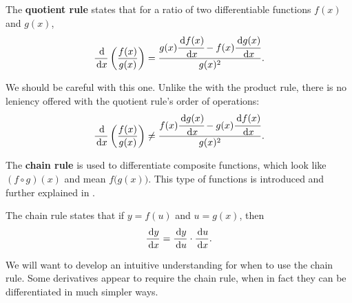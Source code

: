 \begin{theorem}
  The \textbf{quotient rule} states that for a ratio of two differentiable functions $f(x)$ and $g(x)$,
  \begin{equation}
    \frac{\,\mathrm{d}}{\,\mathrm{d} x}\left(\frac{f(x)}{g(x)}\right)=\frac{g(x)\cfrac{\,\mathrm{d} f(x)}{\,\mathrm{d} x}-f(x)\cfrac{\,\mathrm{d} g(x)}{\,\mathrm{d} x}}{g(x)^2}.
  \end{equation}
\end{theorem}
We should be careful with this one.
Unlike the with the product rule, there is no leniency offered with the quotient rule's order of operations:
\begin{equation}
  \frac{\,\mathrm{d}}{\,\mathrm{d} x}\left(\frac{f(x)}{g(x)}\right) \neq \frac{f(x)\cfrac{\,\mathrm{d} g(x)}{\,\mathrm{d} x}-g(x)\cfrac{\,\mathrm{d} f(x)}{\,\mathrm{d} x}}{g(x)^2}.
\end{equation}


The \textbf{chain rule} is used to differentiate composite functions, which look like $(f \circ g)(x)$ and mean $f\big(g(x)\big)$.
This type of functions is introduced and further explained in .
\begin{theorem}
  The chain rule states that if $y=f(u)$ and $u=g(x)$, then
  \begin{equation}
    \frac{\,\mathrm{d} y}{\,\mathrm{d} x}=\frac{\,\mathrm{d} y}{\,\mathrm{d} u} \cdot \frac{\,\mathrm{d} u}{\,\mathrm{d} x}.
  \end{equation}
\end{theorem}
We will want to develop an intuitive understanding for when to use the chain rule.
Some derivatives appear to require the chain rule, when in fact they can be differentiated in much simpler ways.

